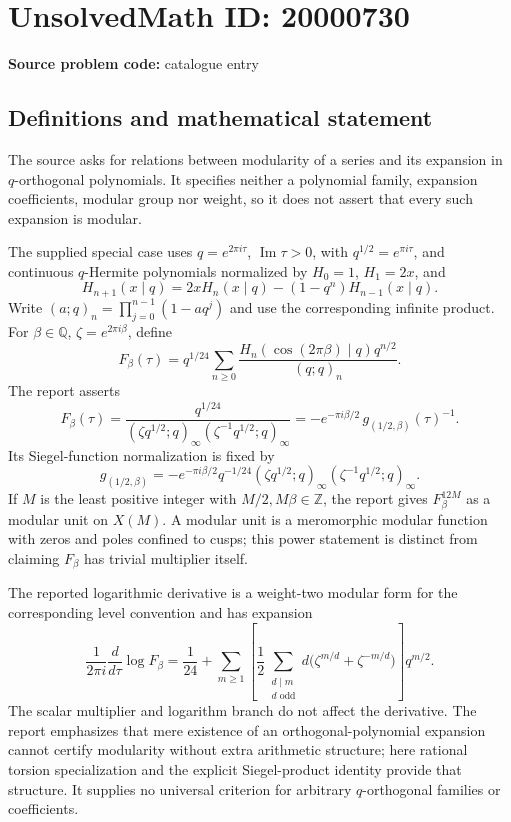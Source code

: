 \documentclass[11pt]{article}
\newcommand{\Z}{\mathbb{Z}}
\newcommand{\Q}{\mathbb{Q}}
\begin{document}
\section*{UnsolvedMath ID: 20000730}
\textbf{Source problem code:} catalogue entry
\subsection{Definitions and mathematical statement}
The source asks for relations between modularity of a series and its expansion in \(q\)-orthogonal polynomials. It specifies neither a polynomial family, expansion coefficients, modular group nor weight, so it does not assert that every such expansion is modular.

The supplied special case uses \(q=e^{2\pi i\tau}\), \(\operatorname{Im}\tau>0\), with \(q^{1/2}=e^{\pi i\tau}\), and continuous \(q\)-Hermite polynomials normalized by \(H_0=1\), \(H_1=2x\), and
\[
 H_{n+1}(x\mid q)=2xH_n(x\mid q)-(1-q^n)H_{n-1}(x\mid q).
\]
Write \((a;q)_n=\prod_{j=0}^{n-1}(1-aq^j)\) and use the corresponding infinite product. For \(\beta\in\Q\), \(\zeta=e^{2\pi i\beta}\), define
\[
 F_\beta(\tau)=q^{1/24}\sum_{n\ge0}
 \frac{H_n(\cos(2\pi\beta)\mid q)q^{n/2}}{(q;q)_n}.
\]
The report asserts
\[
 F_\beta(\tau)=\frac{q^{1/24}}
 {(\zeta q^{1/2};q)_\infty(\zeta^{-1}q^{1/2};q)_\infty}
 =-e^{-\pi i\beta/2}\,g_{(1/2,\beta)}(\tau)^{-1}.
\]
Its Siegel-function normalization is fixed by
\[
 g_{(1/2,\beta)}=-e^{-\pi i\beta/2}q^{-1/24}
 (\zeta q^{1/2};q)_\infty(\zeta^{-1}q^{1/2};q)_\infty.
\]
If \(M\) is the least positive integer with \(M/2,M\beta\in\Z\), the report gives \(F_\beta^{12M}\) as a modular unit on \(X(M)\). A modular unit is a meromorphic modular function with zeros and poles confined to cusps; this power statement is distinct from claiming \(F_\beta\) has trivial multiplier itself.

The reported logarithmic derivative is a weight-two modular form for the corresponding level convention and has expansion
\[
 \frac1{2\pi i}\frac{d}{d\tau}\log F_\beta
 =\frac1{24}+\sum_{m\ge1}\left[\frac12
 \sum_{\substack{d\mid m\\d\text{ odd}}}
 d\bigl(\zeta^{m/d}+\zeta^{-m/d}\bigr)\right]q^{m/2}.
\]
The scalar multiplier and logarithm branch do not affect the derivative. The report emphasizes that mere existence of an orthogonal-polynomial expansion cannot certify modularity without extra arithmetic structure; here rational torsion specialization and the explicit Siegel-product identity provide that structure. It supplies no universal criterion for arbitrary \(q\)-orthogonal families or coefficients.
\end{document}
